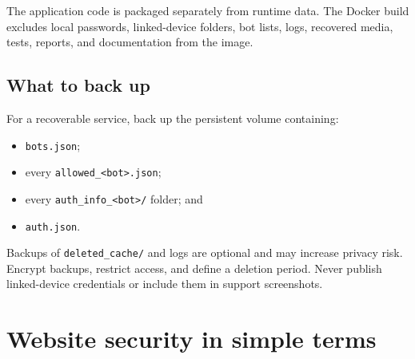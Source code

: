 \documentclass[11pt,a4paper]{article}
\begin{document}
The application code is packaged separately from runtime data. The Docker build excludes local passwords, linked-device folders, bot lists, logs, recovered media, tests, reports, and documentation from the image.

\subsection{What to back up}

For a recoverable service, back up the persistent volume containing:

\begin{itemize}
  \item \texttt{bots.json};
  \item every \texttt{allowed\_<bot>.json};
  \item every \texttt{auth\_info\_<bot>/} folder; and
  \item \texttt{auth.json}.
\end{itemize}

Backups of \texttt{deleted\_cache/} and logs are optional and may increase privacy risk. Encrypt backups, restrict access, and define a deletion period. Never publish linked-device credentials or include them in support screenshots.

\section{Website security in simple terms}
\end{document}
